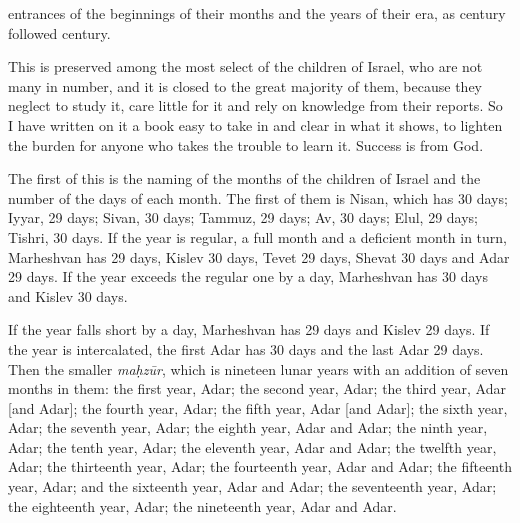 \documentclass[11pt]{article}
\newcommand{\Pg}[1]{\marginpar{\footnotesize #1}}
\begin{document}
entrances of the beginnings of their months and the years of their era, as century followed century.

\Pg{pp. 3–4}This is preserved among the most select of the children of Israel, who are not many in number, and it is closed to the great majority of them, because they neglect to study it, care little for it and rely on knowledge from their reports. So I have written on it a book easy to take in and clear in what it shows, to lighten the burden for anyone who takes the trouble to learn it. Success is from God.

The first of this is the naming of the months of the children of Israel and the number of the days of each month. The first of them is Nisan, which has 30 days; Iyyar, 29 days; Sivan, 30 days; Tammuz, 29 days; Av, 30 days; Elul, 29 days; Tishri, 30 days. If the year is regular, a full month and a deficient month in turn, Marheshvan has 29 days, Kislev 30 days, Tevet 29 days, Shevat 30 days and Adar 29 days. If the year exceeds the regular one by a day, Marheshvan has 30 days and Kislev 30 days.

\Pg{pp. 4–5}If the year falls short by a day, Marheshvan has 29 days and Kislev 29 days. If the year is intercalated, the first Adar has 30 days and the last Adar 29 days. Then the smaller \textit{maḥzūr}, which is nineteen lunar years with an addition of seven months in them: the first year, Adar; the second year, Adar; the third year, Adar [and Adar]; the fourth year, Adar; the fifth year, Adar [and Adar]; the sixth year, Adar; the seventh year, Adar; the eighth year, Adar and Adar; the ninth year, Adar; the tenth year, Adar; the eleventh year, Adar and Adar; the twelfth year, Adar; the thirteenth year, Adar; the fourteenth year, Adar and Adar; the fifteenth year, Adar; and the sixteenth year, Adar and Adar; the seventeenth year, Adar; the eighteenth year, Adar; the nineteenth year, Adar and Adar.
\end{document}
